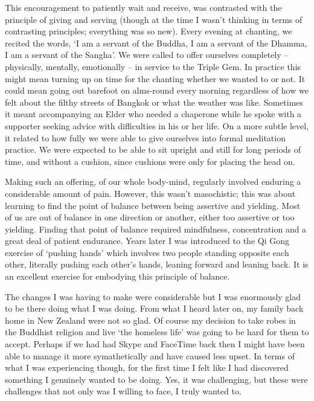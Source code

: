 This encouragement to patiently wait and receive, was contrasted with
the principle of giving and serving (though at the time I wasn't
thinking in terms of contrasting principles; everything was so new).
Every evening at chanting, we recited the words, `I am a servant of the
Buddha, I am a servant of the Dhamma, I am a servant of the Sangha'. We
were called to offer ourselves completely -- physically, mentally,
emotionally -- in service to the Triple Gem. In practice this might mean
turning up on time for the chanting whether we wanted to or not. It
could mean going out barefoot on alms-round every morning regardless of
how we felt about the filthy streets of Bangkok or what the weather was
like. Sometimes it meant accompanying an Elder who needed a chaperone
while he spoke with a supporter seeking advice with difficulties in his
or her life. On a more subtle level, it related to how fully we were
able to give ourselves into formal meditation practice. We were expected
to be able to sit upright and still for long periods of time, and
without a cushion, since cushions were only for placing the head on.

Making such an offering, of our whole body-mind, regularly involved
enduring a considerable amount of pain. However, this wasn't
masochistic; this was about learning to find the point of balance
between being assertive and yielding. Most of us are out of balance in
one direction or another, either too assertive or too yielding. Finding
that point of balance required mindfulness, concentration and a great
deal of patient endurance. Years later I was introduced to the Qi Gong
exercise of `pushing hands' which involves two people standing opposite
each other, literally pushing each other's hands, leaning forward and
leaning back. It is an excellent exercise for embodying this principle
of balance.

The changes I was having to make were considerable but I was enormously
glad to be there doing what I was doing. From what I heard later on, my
family back home in New Zealand were not so glad. Of course my decision
to take robes in the Buddhist religion and live `the homeless life' was
going to be hard for them to accept. Perhaps if we had had Skype and
FaceTime back then I might have been able to manage it more
symathetically and have caused less upset. In terms of what I was
experiencing though, for the first time I felt like I had discovered
something I genuinely wanted to be doing. Yes, it was challenging, but
these were challenges that not only was I willing to face, I truly
wanted to.

